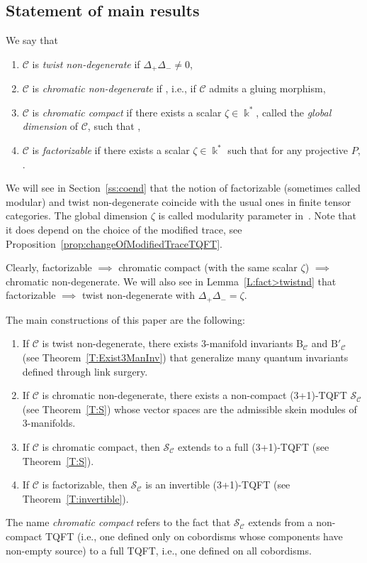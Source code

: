 \documentclass[pdftex]{sigma}
\numberwithin{equation}{section}
\numberwithin{theorem}{section}
\numberwithin{proposition}{section}
\numberwithin{definition}{section}
\numberwithin{lemma}{section}
\numberwithin{corollary}{section}
\numberwithin{remark}{section}
\numberwithin{example}{section}
\newcommand{\cat}{\mathcal{C}}
\newcommand{\unit}{\ensuremath{\mathds{1}}}
\newcommand{\FK}{{\Bbbk}}
\newcommand{\TSkein}{{\mathscr{S}}}
\newcommand{\ThreeManInv}{\mathrm{B}}
\begin{document}
\subsection{Statement of main results}
\begin{definition}\label{def:maindef}
 We say that
 \begin{enumerate}\itemsep=0pt
 \item $\cat$ is \emph{twist non-degenerate} if
 $\Delta_+\Delta_-\neq0$,
 \item $\cat$ is \emph{chromatic non-degenerate} if
 \smash{$\Delta_0^{P_\unit}\neq0$}, i.e., if $\cat$ admits a gluing
 morphism,
 \item $\cat$ is \emph{chromatic compact} if there exists a scalar
 $\zeta\in\FK^*$, called the \emph{global dimension} of $\cat$, such that
 \smash{$\Delta_0^{P_\unit}=\zeta\Lambda_{P_\unit}$},
 \item $\cat$ is \emph{factorizable} if there exists a scalar
 $\zeta\in\FK^*$ such that for any projective $P$,
 .
 \end{enumerate}
\end{definition}
We will see in Section~\ref{ss:coend} that the notion of factorizable (sometimes called modular)
and twist non-degenerate coincide with the usual ones in finite tensor
categories. The global dimension $\zeta$ is called modularity parameter in~\cite{DRGGPMR2022}. Note that it does depend on the choice of the modified trace, see Proposition~\ref{prop:changeOfModifiedTraceTQFT}.


Clearly, factorizable
$\implies$ chromatic compact (with the same
scalar $\zeta$) $\implies$ chromatic non-degenerate. We will also see in Lemma~\ref{L:fact>twistnd}
that factorizable
$\implies$ twist non-degenerate with
$\Delta_+\Delta_-=\zeta$.

The main constructions of this paper are the following:
\begin{enumerate}\itemsep=0pt
\item If $\cat$ is twist non-degenerate, there exists 3-manifold
 invariants $\ThreeManInv_\cat$ and $\ThreeManInv'_\cat$ (see Theorem~\ref{T:Exist3ManInv})
 that generalize many quantum invariants defined
 through link surgery.
\item If $\cat$ is chromatic non-degenerate, there exists a non-compact (3+1)-TQFT $\TSkein_\cat$ (see Theorem~\ref{T:S}) whose vector
 spaces are the admissible skein modules of 3-manifolds.
\item If
$\cat$ is chromatic compact, then $\TSkein_\cat$ extends to a full (3+1)-TQFT (see Theorem~\ref{T:S}).
\item If $\cat$ is factorizable, then $\TSkein_\cat$ is an invertible
 (3+1)-TQFT (see Theorem~\ref{T:invertible}).
\end{enumerate}
\begin{remark}
The name \emph{chromatic compact} refers to the fact that $\TSkein_\cat$ extends from a non-compact TQFT (i.e., one defined only
on
 cobordisms whose components have non-empty source) to a
full TQFT, i.e., one defined
on all cobordisms.
\end{remark}
\end{document}
